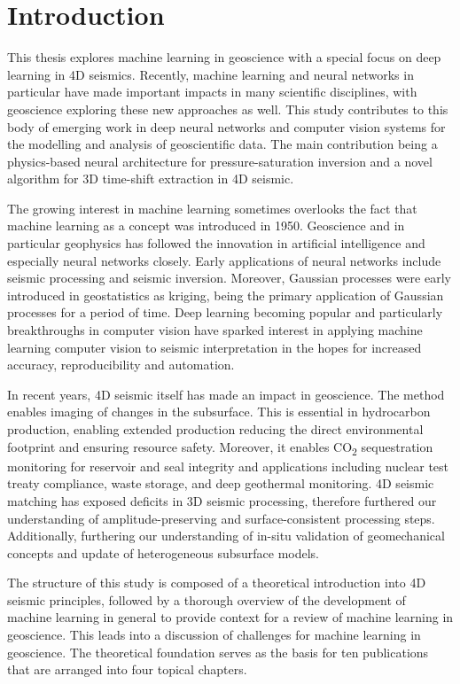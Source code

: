 \chapter{Introduction}

This thesis explores machine learning in geoscience with a special focus on deep learning in 4D seismics. Recently, machine learning and neural networks in particular have made important impacts in many scientific disciplines, with geoscience exploring these new approaches as well. This study contributes to this body of emerging work in deep neural networks and computer vision systems for the modelling and analysis of geoscientific data. The main contribution being a physics-based neural architecture for pressure-saturation inversion and a novel algorithm for 3D time-shift extraction in 4D seismic.

The growing interest in machine learning sometimes overlooks the fact that machine learning as a concept was introduced in 1950. Geoscience and in particular geophysics has followed the innovation in artificial intelligence and especially neural networks closely. Early applications of neural networks include seismic processing and seismic inversion. Moreover, Gaussian processes were early introduced in geostatistics as kriging, being the primary application of Gaussian processes for a period of time. Deep learning becoming popular and particularly breakthroughs in computer vision have sparked interest in applying machine learning computer vision to seismic interpretation in the hopes for increased accuracy, reproducibility and automation.

In recent years, 4D seismic itself has made an impact in geoscience. The method enables imaging of changes in the subsurface. This is essential in hydrocarbon production, enabling extended production reducing the direct environmental footprint and ensuring resource safety. Moreover, it enables CO\textsubscript{2} sequestration monitoring for reservoir and seal integrity and applications including nuclear test treaty compliance, waste storage, and deep geothermal monitoring. 4D seismic matching has exposed deficits in 3D seismic processing, therefore furthered our understanding of amplitude-preserving and surface-consistent processing steps. Additionally, furthering our understanding of in-situ validation of geomechanical concepts and update of heterogeneous subsurface models.

The structure of this study is composed of a theoretical introduction into 4D seismic principles, followed by a thorough overview of the development of machine learning in general to provide context for a review of machine learning in geoscience. This leads into a discussion of challenges for machine learning in geoscience. The theoretical foundation serves as the basis for ten publications that are arranged into four topical chapters. 

